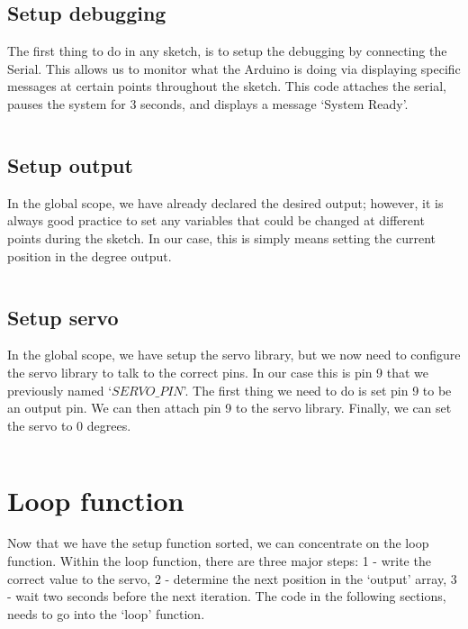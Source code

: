 \documentclass[11pt,a4paper]{article}
\begin{document}
\subsection{Setup debugging}
The first thing to do in any sketch, is to setup the debugging by connecting the Serial. This allows us to monitor what the Arduino is doing via displaying specific messages at certain points throughout the sketch. This code attaches the serial, pauses the system for 3 seconds, and displays a message `System Ready'.\\
\vspace{-1.75em}
\inputminted{arduino}{./src/3-setup-debug.txt}
\vspace{-.5em}

\subsection{Setup output}
In the global scope, we have already declared the desired output; however, it is always good practice to set any variables that could be changed at different points during the sketch. In our case, this is simply means setting the current position in the degree output.\\

\vspace{-1.75em}
\inputminted{arduino}{./src/4-setup-output.txt}
\vspace{-.5em}

\subsection{Setup servo}
In the global scope, we have setup the servo library, but we now need to configure the servo library to talk to the correct pins. In our case this is pin 9 that we previously named `$SERVO\_PIN$'. The first thing we need to do is set pin 9 to be an output pin. We can then attach pin 9 to the servo library. Finally, we can set the servo to 0 degrees.\\

\vspace{-1.75em}
\inputminted{arduino}{./src/5-setup-servo.txt}
\vspace{-.5em}

\section{Loop function}
Now that we have the setup function sorted, we can concentrate on the loop function. Within the loop function, there are three major steps: 1 - write the correct value to the servo, 2 - determine the next position in the `output' array, 3 - wait two seconds before the next iteration. The code in the following sections, needs to go into the `loop' function.\\
\end{document}
